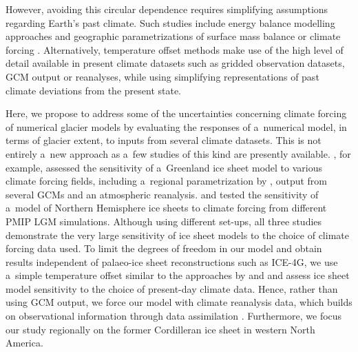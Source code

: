 \documentclass[tc, ms]{copernicus}
\begin{document}
However, avoiding this circular dependence requires simplifying assumptions regarding Earth's past climate. Such studies include energy balance modelling approaches \citep{tarasov-peltier-1997} and geographic parametrizations of surface mass balance \citep{robert-1991} or climate forcing \citep{johnson-fastook-2002}. Alternatively, temperature offset methods \citep{greve-etal-1999,bintanja-etal-2005} make use of the high level of detail available in present climate datasets such as gridded observation datasets, GCM output or reanalyses, while using simplifying representations of past climate deviations from the present state.

Here, we propose to address some of the uncertainties concerning climate forcing of numerical glacier models by evaluating the responses of a~numerical model, in terms of glacier extent, to inputs from several climate datasets. This is not entirely a~new approach as a~few studies of this kind are presently available. \citet{quiquet-etal-2012}, for example, assessed the sensitivity of a~Greenland ice sheet model to various climate forcing fields, including a~regional parametrization by \citet{fausto-etal-2009a}, output from several GCMs and an atmospheric reanalysis. \citet{rodgers-etal-2004} and \citet{charbit-etal-2007} tested the sensitivity of a~model of Northern Hemisphere ice sheets to climate forcing from different PMIP LGM simulations. Although using different set-ups, all three studies demonstrate the very large sensitivity of ice sheet models to the choice of climate forcing data used. To limit the degrees of freedom in our model and obtain results independent of palaeo-ice sheet reconstructions such as ICE-4G, we use a~simple temperature offset similar to the approaches by \citet{greve-etal-1999} and \citet{bintanja-etal-2005} and assess ice sheet model sensitivity to the choice of present-day climate data. Hence, rather than using GCM output, we force our model with climate reanalysis data, which builds on observational information through data assimilation \citep{bengtsson-etal-2007}. Furthermore, we focus our study regionally on the former Cordilleran ice sheet in western North America.
\end{document}
